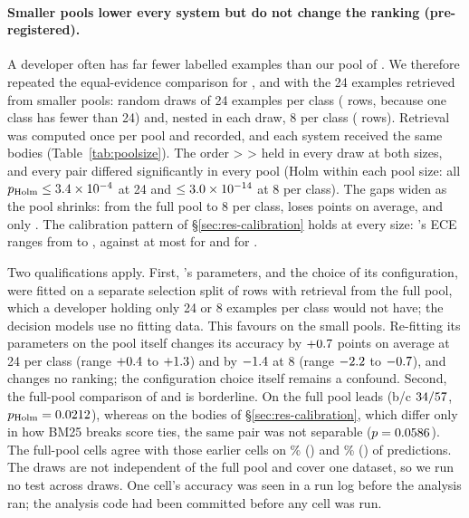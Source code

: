 \paragraph{Smaller pools lower every system but do not change the ranking (pre-registered).} A developer often has
far fewer labelled examples than our pool of \psPoolFull. We therefore repeated the equal-evidence comparison for
\orb, \pplx{} and \flash{} with the 24 examples retrieved from smaller pools: \psDraws{} random draws of 24 examples
per class (\psPoolTwentyFour{} rows, because one class has fewer than 24) and, nested in each draw, 8 per class
(\psPoolEight{} rows). Retrieval was computed once per pool and recorded, and each system received the same bodies
(Table~\ref{tab:poolsize}). The order \flash{} > \pplx{} > \orb{} held in every draw at both sizes, and every pair
differed significantly in every pool (Holm within each pool size: all $p_\text{Holm}\le3.4\times10^{-4}$ at 24
and $\le3.0\times10^{-14}$ at 8 per class). The gaps widen as the pool shrinks: from the full pool to 8 per class,
\orb{} loses \psOpenEightDrop{} points on average, \pplx{} \psPplxEightDrop{} and \flash{} only \psFlashEightDrop.
The calibration pattern of \S\ref{sec:res-calibration} holds at every size: \flash's ECE ranges from
\psFlashEceMinAll{} to \psFlashEceMaxAll, against at most \psPplxEceMaxAll{} for \pplx{} and \psOpenEceMaxAll{} for
\orb.

Two qualifications apply. First, \orb's parameters, and the choice of its configuration, were fitted on a separate
selection split of \fsSelN{} rows with retrieval from the full pool, which a developer holding only 24 or 8 examples per
class would not have; the decision models use no fitting data. This favours \orb{} on the small pools. Re-fitting
its parameters on the pool itself changes its accuracy by $+0.7$ points on average at 24 per class
(range $+0.4$ to $+1.3$) and by $-1.4$ at 8 (range
$-2.2$ to $-0.7$), and changes no ranking; the configuration choice itself remains a
confound. Second, the full-pool comparison of \pplx{} and \flash{} is borderline. On the full pool \flash{} leads
(b/c $34/57$, $p_\text{Holm}=0.0212$), whereas on the bodies
of \S\ref{sec:res-calibration}, which differ only in how BM25 breaks score ties, the same pair was not separable
($p=0.0586$). The full-pool cells agree with those earlier cells on \psPplxFullAgree\% (\pplx) and
\psFlashFullAgree\% (\flash) of predictions. The draws are not independent of the full pool and cover one dataset, so
we run no test across draws. One cell's accuracy was seen in a run log before the analysis ran; the analysis code had
been committed before any cell was run.

